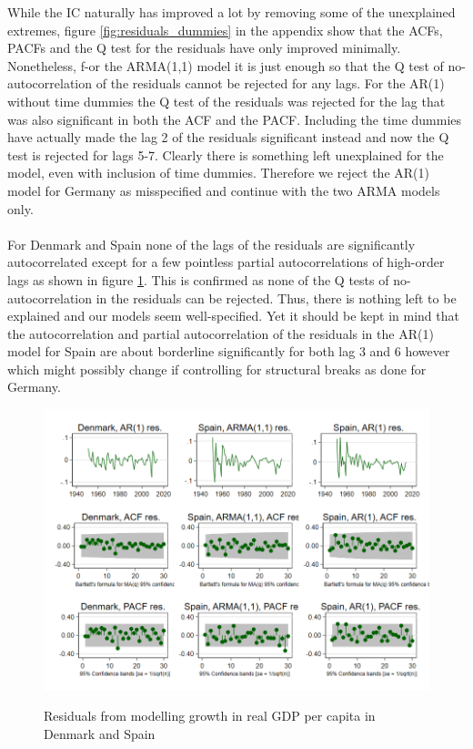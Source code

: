 While the IC naturally has improved a lot by removing some of the unexplained extremes, figure \ref{fig:residuals_dummies} in the appendix show that the ACFs, PACFs and the Q test for the residuals have only improved minimally. Nonetheless, f-or the ARMA(1,1) model it is just enough so that the Q test of no-autocorrelation of the residuals cannot be rejected for any lags. For the AR(1) without time dummies the Q test of the residuals was rejected for the  lag that was also significant in both the ACF and the PACF. Including the time dummies have actually made the lag 2 of the residuals significant instead and now the Q test is rejected for lags 5-7. Clearly there is something left unexplained for the model, even with inclusion of time dummies. Therefore we reject the AR(1) model for Germany as misspecified and continue with the two ARMA models only.
\\
\\
For Denmark and Spain none of the lags of the residuals are significantly autocorrelated except for a few pointless partial autocorrelations of high-order lags as shown in figure \ref{fig:23d}. This is confirmed as none of the Q tests of no-autocorrelation in the residuals can be rejected. Thus, there is nothing left to be explained and our models seem well-specified. Yet it should be kept in mind that the autocorrelation and partial autocorrelation of the residuals in the AR(1) model for Spain are about borderline significantly for both lag 3 and 6 however which might possibly change if controlling for structural breaks as done for Germany.
\begin{figure}[H]
    \centering
    \caption{Residuals from modelling growth in real GDP per capita in Denmark and Spain}
      \includegraphics[width= \textwidth]{03_figures/fig23d}
    \label{fig:23d}
    \vspace{-2cm}
\end{figure}
